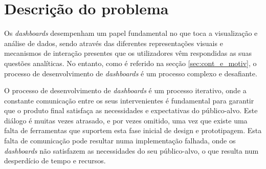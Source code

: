\section{Descrição do problema}
\label{sec:des_problema}

Os \textit{dashboards} desempenham um papel fundamental no que toca a visualização e análise de dados, sendo através das diferentes representações visuais e mecanismos de interação presentes que os utilizadores vêm respondidas as suas questões analíticas. No entanto, como é referido na secção \ref{sec:cont_e_motiv}, o processo de desenvolvimento de \textit{dashboards} é um processo complexo e desafiante. %
\begin{comment}
\begin{itemize}
    \item Conhecer o público-alvo;
    \item Definir o propósito e os objetivos;
    \item Selecionar e preparar os dados relevantes;
    \item Focar na clareza e eficácia da comunicação;
\end{itemize}
\end{comment}

O processo de desenvolvimento de \textit{dashboards} é um processo iterativo, onde a constante comunicação entre os seus intervenientes é fundamental para garantir que o produto final satisfaça as necessidades e expectativas do público-alvo. Este diálogo é muitas vezes atrasado, e por vezes omitido, uma vez que existe uma falta de ferramentas que suportem esta fase inicial de design e prototipagem. Esta falta de comunicação pode resultar numa implementação falhada, onde os \textit{dashboards} não satisfazem as necessidades do seu público-alvo, o que resulta num desperdício de tempo e recursos.

